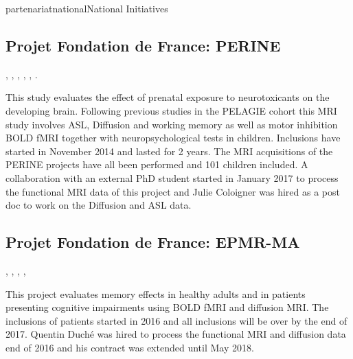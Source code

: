 \documentclass{ra2018}
\begin{document}
\begin{module}{partenariat}{national}{National Initiatives}

        \subsection{Projet Fondation de France: PERINE}
    \begin{participants}
      , 
      , 
      , 
      , 
      ,
      .
    \end{participants}
    This study evaluates the effect of prenatal exposure to neurotoxicants on the
    developing brain. Following previous studies in the PELAGIE cohort this MRI
    study involves ASL, Diffusion and working memory as well as motor inhibition
    BOLD fMRI together with neuropsychological tests in children. Inclusions have
    started in November 2014 and lasted for 2 years.  The MRI acquisitions of the
    PERINE projects have all been performed and 101 children included. A collaboration with an external PhD student started in January 2017 to process the functional MRI data of this project and Julie Coloigner was hired as a post doc to work on the Diffusion and ASL data.
    
    \subsection{Projet Fondation de France: EPMR-MA}
    \begin{participants}
      ,
      , 
      , 
      , 
    \end{participants}
    This project evaluates memory effects in healthy adults and in patients
    presenting cognitive impairments using BOLD fMRI and diffusion MRI. 
    The inclusions of patients started in 2016 and all inclusions will be over by the end of 2017. Quentin Duché was hired to process the functional MRI and diffusion data end of 2016 and his contract was extended until May 2018. 



\end{module}
\end{document}
